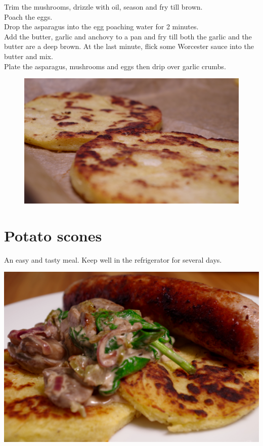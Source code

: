 \documentclass{tufte-book}
\begin{document}
\smallskip
Trim the mushrooms, drizzle with oil, season and fry till brown.
\\Poach the eggs.
\\Drop the asparagus into the egg poaching water for 2 minutes.
\\Add the butter,  garlic and anchovy to a pan and fry till both the garlic and the butter are a deep brown. At the last minute, flick some  Worcester sauce into the butter and mix.
\\Plate the asparagus, mushrooms and eggs then drip over garlic crumbs.

\newpage

\begin{figure}[h]
  \includegraphics[width=\linewidth]{potatoscones.png}
\end{figure}

\section{Potato scones}

An easy and tasty meal. Keep well in the refrigerator for several days. 

\begin{marginfigure}%
  \includegraphics[width=\linewidth]{potatoscones_meal.png}
\end{marginfigure}
\end{document}

